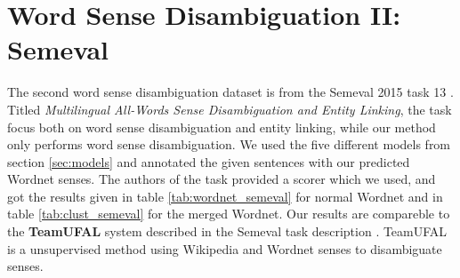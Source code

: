 \section{Word Sense Disambiguation II: Semeval}
The second word sense disambiguation dataset is from the Semeval 2015 task 13 \citep{moro2015semeval}. Titled \emph{Multilingual All-Words Sense Disambiguation and Entity Linking}, the task focus both on word sense disambiguation and entity linking, while our method only performs word sense disambiguation. We used the five different models from section \ref{sec:models} and annotated the given sentences with our predicted Wordnet senses. The authors of the task provided a scorer which we used, and got the results given in table \ref{tab:wordnet_semeval} for normal Wordnet and in table \ref{tab:clust_semeval} for the merged Wordnet. Our results are compareble to the \textbf{TeamUFAL} system described in the Semeval task description \citep{moro2015semeval}. TeamUFAL is a unsupervised method using Wikipedia and Wordnet senses to disambiguate senses.
